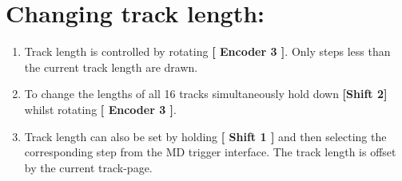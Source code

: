 \section{Changing track length:}
\begin{enumerate}
	\item Track length is controlled by rotating \textbf{[ Encoder 3 ]}. Only steps less than the current track length are drawn.
	\item To change the lengths of all 16 tracks simultaneously hold down \textbf{[Shift 2]} whilst rotating \textbf{[ Encoder 3 ]}.
	\item Track length can also be set by holding \textbf{[ Shift 1 ]} and then selecting the corresponding step from the MD trigger interface. The track length is offset by the current track-page.
\end{enumerate}
